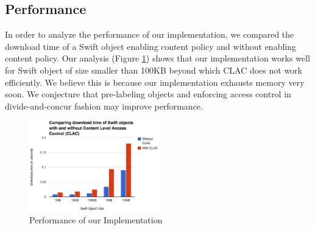 \subsection{Performance}
In order to analyze the performance of our implementation, we compared the download time of a Swift object enabling content policy and without enabling content policy. Our analysis (Figure \ref{fig:performance})  shows that our implementation works well for Swift object of size smaller than 100KB beyond which CLAC does not work efficiently.  We believe this is because our implementation exhausts memory very soon. We conjecture that  pre-labeling objects and enforcing access control in divide-and-concur fashion may improve performance.
\begin{figure}
  \centering
    \includegraphics[width=0.5\textwidth]{CODASPY15/performance.eps}
 \caption{ Performance of our Implementation}
   \label{fig:performance}
\end{figure}

